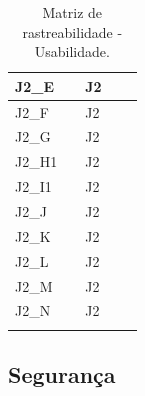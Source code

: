 \begin{longtable}{|l|l|l|l|l|}
J2\_E                                                &                          & J2                     &                         &                                               \\ \hline
J2\_F                                                &                          & J2                     &                         &                                               \\ \hline
J2\_G                                                &                          & J2                     &                         &                                               \\ \hline
J2\_H1                                               &                          & J2                     &                         &                                               \\ \hline
J2\_I1                                               &                          & J2                     &                         &                                               \\ \hline
J2\_J                                                &                          & J2                     &                         &                                               \\ \hline
J2\_K                                                &                          & J2                     &                         &                                               \\ \hline
J2\_L                                                &                          & J2                     &                         &                                               \\ \hline
J2\_M                                                &                          & J2                     &                         &                                               \\ \hline
J2\_N                                                &                          & J2                     &                         &                                               \\ \hline

\caption{Matriz de rastreabilidade - Usabilidade.}
\end{longtable}

\newpage

\subsection{Segurança}

